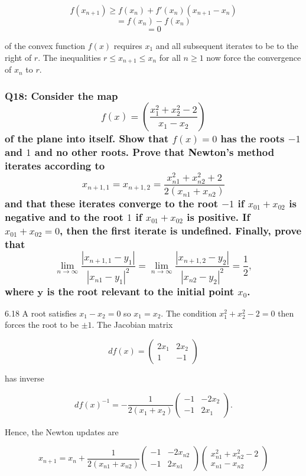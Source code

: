 \documentclass[8pt]{article}
\begin{document}
\[
f(x_{n+1}) \geq f(x_n) + f'(x_n)(x_{n+1} - x_n)
\]
\[
= f(x_n) - f(x_n)
\]
\[
= 0
\]

of the convex function \( f(x) \) requires \( x_1 \) and all subsequent iterates to be to the right of \( r \). The inequalities \( r \leq x_{n+1} \leq x_n \) for all \( n \geq 1 \) now force the convergence of \( x_n \) to \( r \).

\subsubsection*{Q18: Consider the map
\[
f(x) = \left( \frac{x_1^2 + x_2^2 - 2}{x_1 - x_2} \right)
\]
of the plane into itself. Show that \( f(x) = 0 \) has the roots \(-1\) and \(1\) and no other roots. Prove that Newton’s method iterates according to
\[
x_{n+1,1} = x_{n+1,2} = \frac{x_{n1}^2 + x_{n2}^2 + 2}{2(x_{n1} + x_{n2})}
\]
and that these iterates converge to the root \(-1\) if \( x_{01} + x_{02} \) is negative and to the root \( 1 \) if \( x_{01} + x_{02} \) is positive. If \( x_{01} + x_{02} = 0 \), then the first iterate is undefined. Finally, prove that
\[
\lim_{n \to \infty} \frac{|x_{n+1,1} - y_1|}{|x_{n1} - y_1|^2} = \lim_{n \to \infty} \frac{|x_{n+1,2} - y_2|}{|x_{n2} - y_2|^2} = \frac{1}{2},
\]
where \( \mathbf{y} \) is the root relevant to the initial point \( x_0 \).}

6.18 A root satisfies \( x_1 - x_2 = 0 \) so \( x_1 = x_2 \). The condition \( x_1^2 + x_2^2 - 2 = 0 \) then forces the root to be \(\pm 1\). The Jacobian matrix

\[
df(x) = \begin{pmatrix}
2x_1 & 2x_2 \\
1 & -1
\end{pmatrix}
\]

has inverse

\[
df(x)^{-1} = -\frac{1}{2(x_1 + x_2)} \begin{pmatrix}
-1 & -2x_2 \\
-1 & 2x_1
\end{pmatrix}.
\]

Hence, the Newton updates are

\[
x_{n+1} = x_n + \frac{1}{2(x_{n1} + x_{n2})} \begin{pmatrix}
-1 & -2x_{n2} \\
-1 & 2x_{n1}
\end{pmatrix} \begin{pmatrix}
x_{n1}^2 + x_{n2}^2 - 2 \\
x_{n1} - x_{n2}
\end{pmatrix}
\]
\end{document}
